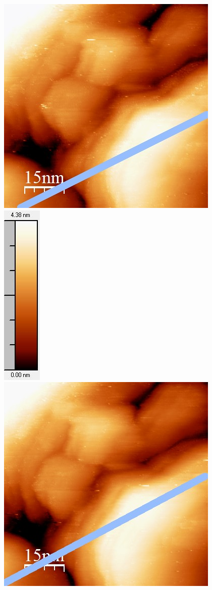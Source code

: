 \documentclass[12pt,a4paper]{article}
\begin{document}
\begin{figure}[H]
\centering
\includegraphics[scale=0.6]{Bilder/Anhang/Zeit/0_08_Zeit_vor.jpg}
\includegraphics[scale=0.6]{Bilder/Anhang/Zeit/0_08_Zeit_vor_Skala.jpg}
\includegraphics[scale=0.6]{Bilder/Anhang/Zeit/0_08_Zeit_nach.jpg}

\end{figure}
\end{document}
